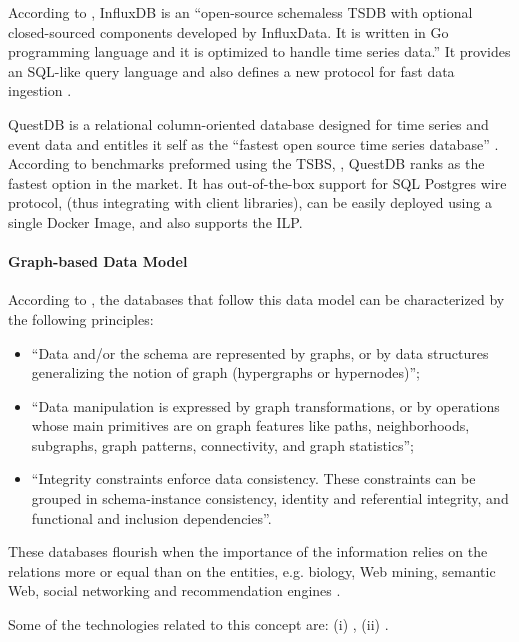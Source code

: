 According to \cite{naqvi2017time}, InfluxDB is an ``open-source schemaless \gls{TSDB} with optional closed-sourced components developed by InfluxData. It is written in Go programming language and it is optimized to handle time series data.'' It provides an SQL-like query language and also defines a new protocol for fast data ingestion \parencite{ilp}.

QuestDB is a relational column-oriented database designed for time series and event data and entitles it self as the ``fastest open source time series database'' \parencite{questdb}.
According to benchmarks \parencite{quest-bench} preformed using the \gls{TSBS}, \cite{TSBS}, QuestDB ranks as the fastest option in the market.
It has out-of-the-box support for SQL Postgres wire protocol, (thus integrating with  client libraries), can be easily deployed using a single Docker Image, and also supports the \gls{ILP}.

\paragraph{Graph-based Data Model}
\label{par:stateofart:arch:infra:store:graph}

According to \cite{angles2008survey}, the databases that follow this data model can be characterized by the following principles:

\begin{itemize}
    \item ``Data and/or the schema are represented by graphs, or by data structures generalizing the notion of graph (hypergraphs or hypernodes)'';
    \item ``Data manipulation is expressed by graph transformations, or by operations whose main primitives are on graph features like paths, neighborhoods, subgraphs, graph patterns, connectivity, and graph statistics'';
    \item ``Integrity constraints enforce data consistency. These constraints can be grouped in schema-instance consistency, identity and referential integrity, and functional and inclusion dependencies''.
\end{itemize}

These databases flourish when the importance of the information relies on the relations more or equal than on the entities, e.g. biology, Web mining, semantic Web, social networking and recommendation engines \parencite{angles2012comparison, miller2013graph}.

Some of the technologies related to this concept are: (i) , (ii) .

